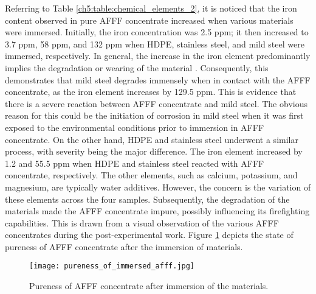 Referring to Table \ref{ch5:table:chemical_elements_2}, it is noticed that the iron content observed in pure AFFF concentrate increased when various materials were immersed. Initially, the iron concentration was 2.5 ppm; it then increased to 3.7 ppm, 58 ppm, and 132 ppm when HDPE, stainless steel, and mild steel were immersed, respectively. In general, the increase in the iron element predominantly implies the degradation or wearing of the material \cite{mcarthur2004engineering}. Consequently, this demonstrates that mild steel degrades immensely when in contact with the AFFF concentrate, as the iron element increases by 129.5 ppm. This is evidence that there is a severe reaction between AFFF concentrate and mild steel. The obvious reason for this could be the initiation of corrosion in mild steel when it was first exposed to the environmental conditions prior to immersion in AFFF concentrate. On the other hand, HDPE and stainless steel underwent a similar process, with severity being the major difference. The iron element increased by 1.2 and 55.5 ppm when HDPE and stainless steel reacted with AFFF concentrate, respectively.
The other elements, such as calcium, potassium, and magnesium, are typically water additives. However, the concern is the variation of these elements across the four samples. Subsequently, the degradation of the materials made the AFFF concentrate impure, possibly influencing its firefighting capabilities. This is drawn from a visual observation of the various AFFF concentrates during the post-experimental work. Figure \ref{ch5:figure:pureness} depicts the state of pureness of AFFF concentrate after the immersion of materials.
 
\begin{figure}[H]
    \centering
    \texttt{[image: pureness\_of\_immersed\_afff.jpg]}
    \caption{Pureness of AFFF concentrate after immersion of the materials.}
    \label{ch5:figure:pureness}
\end{figure}

